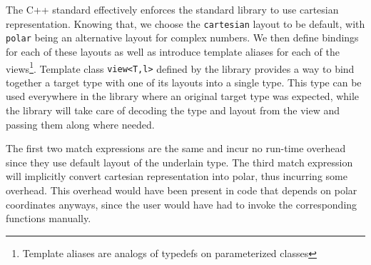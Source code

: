 \documentclass[preprint]{sigplanconf}
\makeatletter
\DeclareRobustCommand{\code}[1]{{\lstinline[breaklines=false,escapechar=@]{#1}}}
\makeatother
\begin{document}
\noindent
The C++ standard effectively enforces the standard library to use cartesian 
representation\cite[-4]{C++0x}. Knowing that, we choose the 
\code{cartesian} layout to be default, with \code{polar} being an alternative 
layout for complex numbers. We then define bindings for each of these layouts as 
well as introduce template aliases for each of the views\footnote{Template 
aliases are analogs of typedefs on parameterized classes}. Template class 
\code{view<T,l>} defined by the library provides a way to bind together a target 
type with one of its layouts into a single type. This type can be used 
everywhere in the library where an original target type was expected, while the  
library will take care of decoding the type and layout from the view and passing 
them along where needed.

The first two match expressions are the same and incur no run-time overhead 
since they use default layout of the underlain type. The third match expression 
will implicitly convert cartesian representation into polar, thus incurring some 
overhead. This overhead would have been present in code that depends on polar 
coordinates anyways, since the user would have had to invoke the corresponding 
functions manually.



\end{document}
